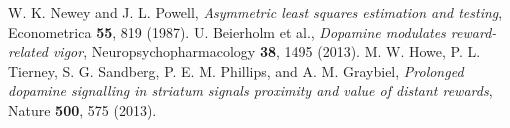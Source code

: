  W. K. Newey and J. L. Powell, \emph{Asymmetric least squares estimation and testing}, Econometrica \textbf{55}, 819 (1987).
 U. Beierholm et al., \emph{Dopamine modulates reward-related vigor}, Neuropsychopharmacology \textbf{38}, 1495 (2013).
 M. W. Howe, P. L. Tierney, S. G. Sandberg, P. E. M. Phillips, and A. M. Graybiel, \emph{Prolonged dopamine signalling in striatum signals proximity and value of distant rewards}, Nature \textbf{500}, 575 (2013).
